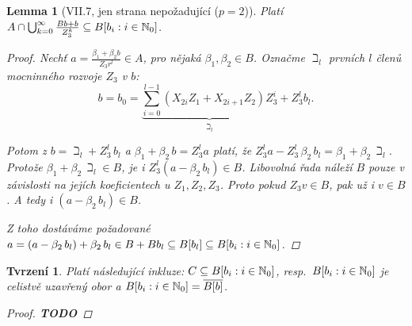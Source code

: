 \documentclass[11pt,a4paper]{article}
\newcommand*{\todo}[1]{\textbf{TODO} #1}
\newcommand*{\mld}[1]{\[#1\]} %
\let \icl \overline %
\newcounter{numb}
\theoremstyle{definition}
\theoremstyle{plain}
\newtheorem{lemma}[numb]{Lemma}
\newtheorem{tvrzeni}[numb]{Tvrzení}
\begin{document}
\begin{lemma}[VII.7, jen strana nepožadující ($p = 2$)]
	Platí $A \cap \bigcup_{k = 0}^\infty \frac{B b + b}{Z_3^k} \subseteq B[b_i: i \in \mathbb { N }_0]$.

	\begin{proof}
		Nechť $a = \frac{\beta_1 + \beta_2 b}{Z_3r^l} \in A$, pro nějaká $\beta_1, \beta_2 \in B$. Označme $\beth_l$ prvních $l$ členů mocninného rozvoje $Z_3$ v $b$:
		\mld{
			b = b_0 = \underbrace{\sum_{i = 0}^{l - 1} (X_{2i} Z_1 + X_{2i+1} Z_2) Z_3^i}_{\beth_l} + Z_3^l b_l.
		}

		Potom z $b = \beth_l + Z_3^l\,b_l$ a $\beta_1 + \beta_2\,b = Z_3^l a$ platí, že $Z_3^l a - Z_3^l\,\beta_2\,b_l = \beta_1 + \beta_2\,\beth_l$. Protože $\beta_1 + \beta_2\,\beth_l \in B$, je i $Z_3^l (a - \beta_2\,b_l)
		\in B$. Libovolná řada náleží $B$ pouze v závislosti na jejích koeficientech u $Z_1, Z_2, Z_3$. Proto pokud $Z_3 v \in B$, pak už i $v \in B$. A tedy i $(a - \beta_2\,b_l) \in B$.

		Z toho dostáváme požadované $a = (a - \beta_2\,b_l) + \beta_2\,b_l \in B + B b_l \subseteq B[b_l] \subseteq B[b_i: i \in \mathbb { N }_0]$.
	\end{proof}
\end{lemma}

\begin{tvrzeni}
	Platí následující inkluze: $C \subseteq B[b_i: i \in \mathbb { N }_0]$, resp.\ $B[b_i: i \in \mathbb { N }_0]$ je celistvě uzavřený obor a $\Ball = \icl{B[b]}$.

	\begin{proof}
		\todo
	\end{proof}
\end{tvrzeni}
\end{document}
